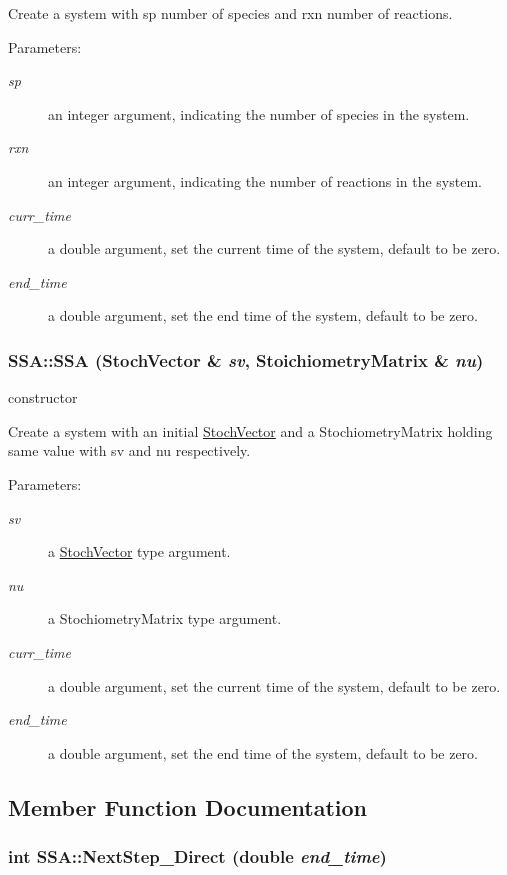 Create a system with sp number of species and rxn number of reactions. \begin{Desc}
\item[Parameters:]
\begin{description}
\item[{\em sp}]an integer argument, indicating the number of species in the system. \item[{\em rxn}]an integer argument, indicating the number of reactions in the system. \item[{\em curr\_\-time}]a double argument, set the current time of the system, default to be zero. \item[{\em end\_\-time}]a double argument, set the end time of the system, default to be zero. \end{description}
\end{Desc}
\hypertarget{class_s_s_a_e4f48e01ecf12a1f2ea86b4af7d65556}{
\subsubsection{\setlength{\rightskip}{0pt plus 5cm}SSA::SSA ({\bf StochVector} \& {\em sv}, \/  {\bf StoichiometryMatrix} \& {\em nu})}}
\label{class_s_s_a_e4f48e01ecf12a1f2ea86b4af7d65556}


constructor 

Create a system with an initial \hyperlink{class_stoch_vector}{StochVector} and a StochiometryMatrix holding same value with sv and nu respectively. \begin{Desc}
\item[Parameters:]
\begin{description}
\item[{\em sv}]a \hyperlink{class_stoch_vector}{StochVector} type argument. \item[{\em nu}]a StochiometryMatrix type argument. \item[{\em curr\_\-time}]a double argument, set the current time of the system, default to be zero. \item[{\em end\_\-time}]a double argument, set the end time of the system, default to be zero. \end{description}
\end{Desc}


\subsection{Member Function Documentation}
\hypertarget{class_s_s_a_b88174aca0c6742aa470cdcf74dfdb83}{
\subsubsection{\setlength{\rightskip}{0pt plus 5cm}int SSA::NextStep\_\-Direct (double {\em end\_\-time})}}
\label{class_s_s_a_b88174aca0c6742aa470cdcf74dfdb83}


